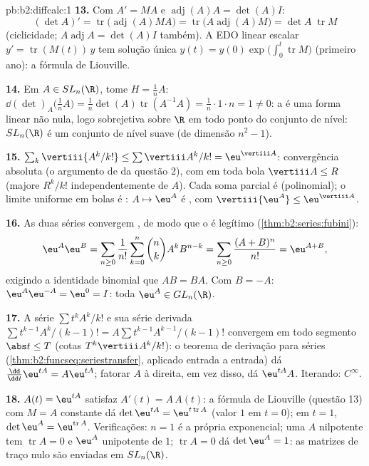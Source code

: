 \begin{solution}{pb:b2:diffcalc:1}
\textbf{13.} Com $A' = MA$ e
$\operatorname{adj}(A)A = \det(A)I$:
\[
(\det A)' = \operatorname{tr}\bigl(\operatorname{adj}(A)MA
\bigr)
= \operatorname{tr}\bigl(A\operatorname{adj}(A)M\bigr)
= \det A\;\operatorname{tr}M
\]
(ciclicidade; $A\operatorname{adj}A = \det(A) I$ também). A
EDO linear escalar $y' = \operatorname{tr}(M(t))\,y$ tem
solução única $y(t) = y(0)\exp\bigl(\int_0^t
\operatorname{tr}M\bigr)$ (primeiro ano): a fórmula de Liouville.

\textbf{14.} Em $A \in SL_n(\R)$, tome $H = \frac1nA$:
$\dd(\det)_A\bigl(\tfrac1nA\bigr) = \frac1n\det(A)
\operatorname{tr}(A^{-1}A) = \frac1n\cdot1\cdot n = 1 \neq 0$:
a  é uma forma linear não nula, logo sobrejetiva
sobre $\R$ em todo ponto do conjunto de nível: $SL_n(\R)$ é um
conjunto de nível suave (de dimensão $n^2 - 1$).

\textbf{15.} $\sum_k\vertiii{A^k/k!} \leq
\sum\vertiii A^k/k! = \eu^{\vertiii A}$: convergência absoluta
(o argumento de  da questão 2), com 
em toda bola $\vertiii A \leq R$ (majore $R^k/k!$ independentemente
de $A$). Cada soma parcial é  (polinomial); o
limite uniforme em bolas é : $A \mapsto \eu^A$ é
, com $\vertiii{\eu^A} \leq \eu^{\vertiii A}$.

\textbf{16.} As duas séries convergem , de modo que o  é legítimo (\cref{thm:b2:series:fubini}):
\[
\eu^A\eu^B = \sum_{n\geq0}\frac{1}{n!}\sum_{k=0}^n\binom
nkA^kB^{n-k}
= \sum_{n\geq0}\frac{(A+B)^n}{n!} = \eu^{A+B},
\]
exigindo a identidade binomial que $AB = BA$. Com $B = -A$:
$\eu^A\eu^{-A} = \eu^0 = I$: toda $\eu^A \in GL_n(\R)$.

\textbf{17.} A série $\sum t^kA^k/k!$ e sua série derivada
$\sum t^{k-1}A^k/(k-1)! = A\sum t^{k-1}A^{k-1}/(k-1)!$ convergem
 em todo segmento $\abs t \leq T$ (cotas
$T^k\vertiii A^k/k!$): o teorema de derivação para séries
(\cref{thm:b2:funcseq:seriestransfer}, aplicado entrada a entrada)
dá $\frac{\dd}{\dd t}\eu^{tA} = A\eu^{tA}$; fatorar $A$
à direita, em vez disso, dá $\eu^{tA}A$. Iterando: $C^\infty$.

\textbf{18.} $A(t) = \eu^{tA}$ satisfaz $A'(t) = A\,A(t)$:
a fórmula de Liouville (questão 13) com $M = A$ constante dá
$\det\eu^{tA} = \eu^{t\operatorname{tr}A}$ (valor $1$ em $t =
0$); em $t = 1$, $\det\eu^A = \eu^{\operatorname{tr}A}$.
Verificações: $n = 1$ é a própria exponencial; uma $A$ nilpotente tem
$\operatorname{tr}A = 0$ e $\eu^A$ unipotente de 
$1$; $\operatorname{tr}A = 0$ dá $\det\eu^A = 1$: as
matrizes de traço nulo são enviadas em $SL_n(\R)$.


\end{solution}
